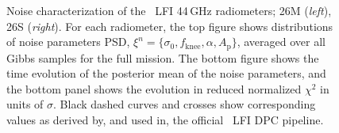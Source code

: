 \documentclass{aa}
\begin{document}
\begin{figure}[t]
        \caption{Noise characterization of the \Planck\ LFI 44\,GHz
                radiometers; 26M (\emph{left}), 26S (\emph{right}). For each
                radiometer, the top figure shows distributions of noise parameters
                PSD, $\xi^n = \{\sigma_0, f_\mathrm{knee}, \alpha, A_\mathrm{p}\}$, averaged
                over all Gibbs samples for the full mission. The bottom figure
                shows the time evolution of the posterior mean of the noise
                parameters, and the bottom panel shows the evolution in reduced
                normalized $\chi^2$ in units of $\sigma$. Black dashed curves and crosses show corresponding values as derived by, and used in, the
                official \Planck\ LFI DPC pipeline.
                \label{fig:xi_prop_44_2}}
\end{figure}
\end{document}
